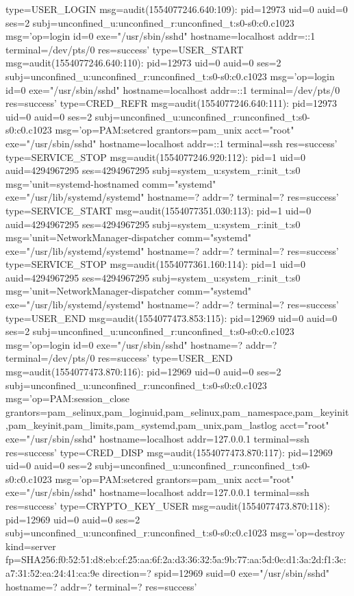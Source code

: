 \documentclass[]{report}
\newenvironment{Shaded}{}{}
\newcommand{\NormalTok}[1]{#1}
\begin{document}
\begin{Shaded}
\begin{Highlighting}[]
\NormalTok{type=USER_LOGIN msg=audit(1554077246.640:109): pid=12973 uid=0 auid=0 ses=2 subj=unconfined_u:unconfined_r:unconfined_t:s0-s0:c0.c1023 msg='op=login id=0 exe="/usr/sbin/sshd" hostname=localhost addr=::1 terminal=/dev/pts/0 res=success'}
\NormalTok{type=USER_START msg=audit(1554077246.640:110): pid=12973 uid=0 auid=0 ses=2 subj=unconfined_u:unconfined_r:unconfined_t:s0-s0:c0.c1023 msg='op=login id=0 exe="/usr/sbin/sshd" hostname=localhost addr=::1 terminal=/dev/pts/0 res=success'}
\NormalTok{type=CRED_REFR msg=audit(1554077246.640:111): pid=12973 uid=0 auid=0 ses=2 subj=unconfined_u:unconfined_r:unconfined_t:s0-s0:c0.c1023 msg='op=PAM:setcred grantors=pam_unix acct="root" exe="/usr/sbin/sshd" hostname=localhost addr=::1 terminal=ssh res=success'}
\NormalTok{type=SERVICE_STOP msg=audit(1554077246.920:112): pid=1 uid=0 auid=4294967295 ses=4294967295 subj=system_u:system_r:init_t:s0 msg='unit=systemd-hostnamed comm="systemd" exe="/usr/lib/systemd/systemd" hostname=? addr=? terminal=? res=success'}
\NormalTok{type=SERVICE_START msg=audit(1554077351.030:113): pid=1 uid=0 auid=4294967295 ses=4294967295 subj=system_u:system_r:init_t:s0 msg='unit=NetworkManager-dispatcher comm="systemd" exe="/usr/lib/systemd/systemd" hostname=? addr=? terminal=? res=success'}
\NormalTok{type=SERVICE_STOP msg=audit(1554077361.160:114): pid=1 uid=0 auid=4294967295 ses=4294967295 subj=system_u:system_r:init_t:s0 msg='unit=NetworkManager-dispatcher comm="systemd" exe="/usr/lib/systemd/systemd" hostname=? addr=? terminal=? res=success'}
\NormalTok{type=USER_END msg=audit(1554077473.853:115): pid=12969 uid=0 auid=0 ses=2 subj=unconfined_u:unconfined_r:unconfined_t:s0-s0:c0.c1023 msg='op=login id=0 exe="/usr/sbin/sshd" hostname=? addr=? terminal=/dev/pts/0 res=success'}
\NormalTok{type=USER_END msg=audit(1554077473.870:116): pid=12969 uid=0 auid=0 ses=2 subj=unconfined_u:unconfined_r:unconfined_t:s0-s0:c0.c1023 msg='op=PAM:session_close grantors=pam_selinux,pam_loginuid,pam_selinux,pam_namespace,pam_keyinit,pam_keyinit,pam_limits,pam_systemd,pam_unix,pam_lastlog acct="root" exe="/usr/sbin/sshd" hostname=localhost addr=127.0.0.1 terminal=ssh res=success'}
\NormalTok{type=CRED_DISP msg=audit(1554077473.870:117): pid=12969 uid=0 auid=0 ses=2 subj=unconfined_u:unconfined_r:unconfined_t:s0-s0:c0.c1023 msg='op=PAM:setcred grantors=pam_unix acct="root" exe="/usr/sbin/sshd" hostname=localhost addr=127.0.0.1 terminal=ssh res=success'}
\NormalTok{type=CRYPTO_KEY_USER msg=audit(1554077473.870:118): pid=12969 uid=0 auid=0 ses=2 subj=unconfined_u:unconfined_r:unconfined_t:s0-s0:c0.c1023 msg='op=destroy kind=server fp=SHA256:f0:52:51:d8:eb:cf:25:aa:6f:2a:d3:36:32:5a:9b:77:aa:5d:0e:d1:3a:2d:f1:3c:a7:31:52:ea:24:41:ca:9e direction=? spid=12969 suid=0  exe="/usr/sbin/sshd" hostname=? addr=? terminal=? res=success'}

\end{Highlighting}
\end{Shaded}
\end{document}
